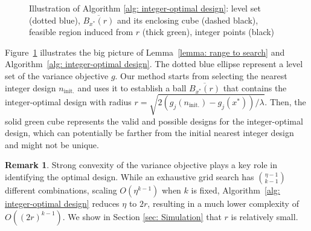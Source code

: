 \documentclass{article}
\theoremstyle{definition}
\newtheorem{remark}[theorem]{Remark}
\begin{document}
\begin{figure}[t]
    \caption{Illustration of Algorithm \ref{alg: integer-optimal design}: %
    level set (dotted blue), $\overline{{B_{x^*}(r)}}$ and its enclosing cube (dashed black), feasible region induced from $r$ (thick green), integer points (black)}
    \label{fig: alg}
\end{figure}

Figure~\ref{fig: alg} illustrates the big picture of Lemma~\ref{lemma: range to search} and Algorithm~\ref{alg: integer-optimal design}. The dotted blue ellipse represent a level set of the variance objective $g$. Our method starts from selecting the nearest integer design $n_{\text{init.}}$ and uses it to establish a ball $\overline{{B_{x^*}(r)}}$ that contains the integer-optimal design with radius $r=\sqrt{2 (g_j (n_{\text{init.}}) - g_j (x^*))/\lambda}$. Then, the solid green cube represents the valid and possible designs for the integer-optimal design, which can potentially be farther from the initial nearest integer design and might not be unique.

\begin{remark}
    Strong convexity of the variance objective plays a key role in identifying the optimal design. While an exhaustive grid search has $\binom{\eta-1}{k-1}$ different combinations, scaling $O(\eta^{k-1})$ when $k$ is fixed, Algorithm~\ref{alg: integer-optimal design} reduces $\eta$ to $2r$, resulting in a much lower complexity of $O\left((2r)^{k-1}\right)$. We show in Section \ref{sec: Simulation} that $r$ is relatively small. %
\end{remark}
\end{document}
